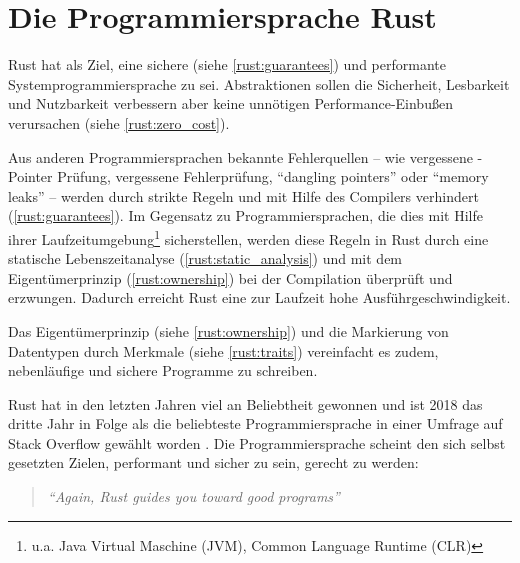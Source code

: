 
\chapter{Die Programmiersprache Rust}
\label{rust}

Rust hat als Ziel, eine sichere (siehe \autoref{rust:guarantees}) und performante Systemprogrammiersprache zu sei.
Abstraktionen sollen die Sicherheit, Lesbarkeit und Nutzbarkeit verbessern aber keine unnötigen Performance-Einbußen verursachen (siehe \autoref{rust:zero_cost}).

Aus anderen Programmiersprachen bekannte Fehlerquellen -- wie vergessene -Pointer Prüfung, vergessene Fehlerprüfung, \enquote{dangling pointers} oder \enquote{memory leaks} --  werden durch strikte Regeln und mit Hilfe des Compilers verhindert (\autoref{rust:guarantees}).
Im Gegensatz zu Programmiersprachen, die dies mit Hilfe ihrer Laufzeitumgebung\footnote{u.a. Java Virtual Maschine (JVM), Common Language Runtime (CLR)} sicherstellen, werden diese Regeln in Rust durch eine statische Lebenszeitanalyse (\autoref{rust:static_analysis}) und mit dem Eigentümerprinzip (\autoref{rust:ownership}) bei der Compilation überprüft und erzwungen.
Dadurch erreicht Rust eine zur Laufzeit hohe Ausführgeschwindigkeit.

Das Eigentümerprinzip (siehe \autoref{rust:ownership}) und die Markierung von Datentypen durch Merkmale (siehe \autoref{rust:traits}) vereinfacht es zudem, nebenläufige und sichere Programme zu schreiben.

Rust hat in den letzten Jahren viel an Beliebtheit gewonnen und ist 2018 das dritte Jahr in Folge als die beliebteste Programmiersprache in einer Umfrage auf Stack Overflow gewählt worden \cite{rust:stack_overflow:mose_loved}.
Die Programmiersprache scheint den sich selbst gesetzten Zielen, performant und sicher zu sein, gerecht zu werden:

\begin{quotation}
	\textit{\enquote{Again, Rust guides you toward good programs}}
	\cite[497]{rust:orly_programming}
\end{quotation}

